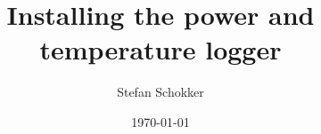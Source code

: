 \documentclass[a4paper, 12pt, one column, aas_macros]{article}
\begin{document}
\begin{titlepage}
    \title{
        Installing the power and temperature logger
    }
    \author{Stefan Schokker}
    \date{\today}
    \thispagestyle{empty}
\end{titlepage}

\maketitle
\thispagestyle{empty}

\newpage
\thispagestyle{empty}
\tableofcontents
\newpage

\setcounter{page}{1}



\end{document}
